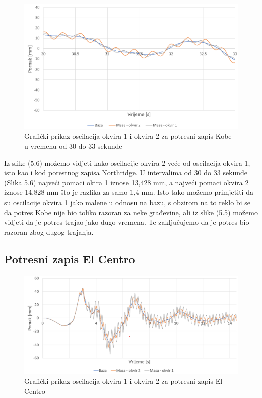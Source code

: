 \documentclass[12pt]{book}
\begin{document}
\begin{figure}[H]
	\centering
	\includegraphics[width=1\linewidth]{Slike/kobe_30-40}
	\caption{Grafički prikaz oscilacija okvira 1 i okvira 2 za potresni zapis Kobe u vremenu od 30 do 33 sekunde}
	\label{fig:kobe30-40}
\end{figure}


Iz slike (5.6) možemo vidjeti kako oscilacije okvira 2 veće od oscilacija okvira 1, isto kao i kod porestnog zapisa Northridge. U intervalima od 30 do 33 sekunde (Slika 5.6) najveći pomaci okira 1 iznose 13,428 mm, a najveći pomaci okvira 2 iznose 14,828 mm što je razlika za samo 1,4 mm. Isto tako možemo primjetiti da su oscilacije okvira 1 jako malene u odnosu na bazu, s obzirom na to reklo bi se da potres Kobe nije bio toliko razoran za neke građevine, ali iz slike (5.5) možemo vidjeti da je potres trajao jako dugo vremena. Te zaključujemo da je potres bio razoran zbog dugog trajanja. 


\subsection{Potresni zapis El Centro}

\begin{figure}[H]
	\centering
	\includegraphics[width=1\linewidth]{Slike/el_centro_graf}
	\caption{Grafički prikaz oscilacija okvira 1 i okvira 2 za potresni zapis El Centro}
	\label{fig:elcentrograf}
\end{figure}
\end{document}
